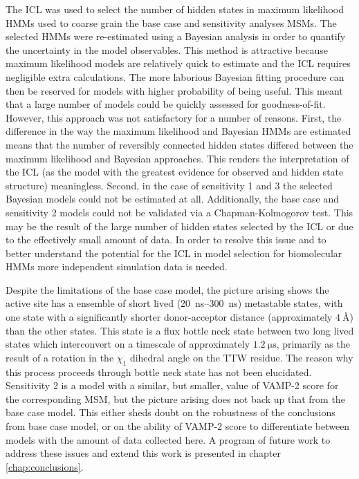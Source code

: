 The ICL was used to select the number of hidden states in maximum likelihood HMMs used to coarse grain the base case and sensitivity analyses MSMs. The selected HMMs were re-estimated using a Bayesian analysis in order to quantify the uncertainty in the model observables. This method is attractive because maximum likelihood models are relatively quick to estimate and the ICL requires negligible extra calculations. The more laborious Bayesian fitting procedure can then be reserved for models with higher probability of being useful. This meant that a large number of models could be quickly assessed for goodness-of-fit. However, this approach was not satisfactory for a number of reasons. First, the difference in the way the maximum likelihood and Bayesian HMMs are estimated means that the number of reversibly connected hidden states differed between the maximum likelihood and Bayesian approaches. This renders the interpretation of the ICL (as the model with the greatest evidence for observed and hidden state structure) meaningless. Second, in the case of sensitivity 1 and 3 the selected Bayesian models could not be estimated at all. Additionally, the base case and sensitivity 2 models could not be validated via a Chapman-Kolmogorov test. This may be the result of the large number of hidden states selected by the ICL or due to the effectively small amount of data. In order to resolve this issue and to better understand the potential for the ICL in model selection for biomolecular HMMs more independent simulation data is needed. 

Despite the limitations of the base case model, the picture arising shows the active site has a ensemble of short lived (\SIrange{20}{300}{\nano\second}) metastable states, with one state with a significantly shorter donor-acceptor distance (approximately $\SI{4}{\angstrom}$) than the other states. This state is a flux bottle neck state between two long lived states which interconvert on a timescale of approximately $\SI{1.2}{\micro\second}$, primarily as the result of a rotation in the $\chi_1$ dihedral angle on the TTW residue. The reason why this process proceeds through bottle neck state has not been elucidated. Sensitivity 2 is a model with a similar, but smaller, value of VAMP-2 score for the corresponding MSM, but the picture arising does not back up that from the base case model. This either sheds doubt on the robustness of the conclusions from base case model, or on the ability of VAMP-2 score to differentiate between models with the amount of data collected here. A program of future work to address these issues and extend this work is presented in chapter \ref{chap:conclusions}.  









